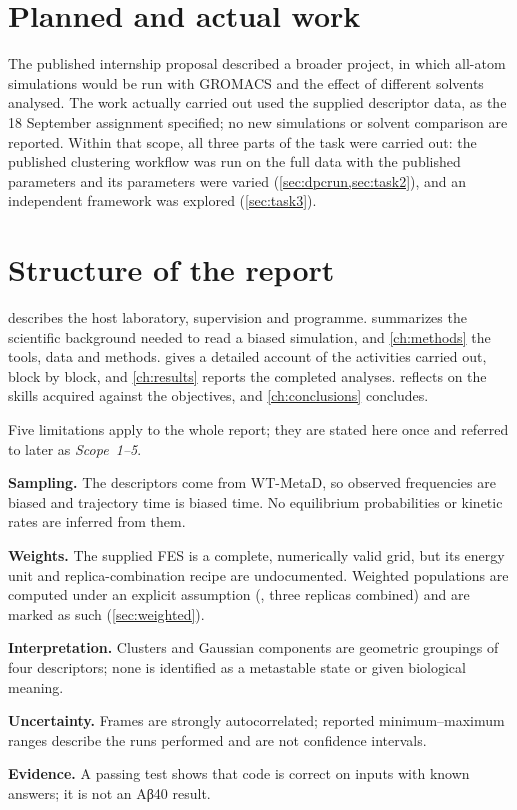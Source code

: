 \section{Planned and actual work}
The published internship proposal described a broader project, in which all-atom simulations would be run with GROMACS and the effect of different solvents analysed. The work actually carried out used the supplied descriptor data, as the 18 September assignment specified; no new simulations or solvent comparison are reported. Within that scope, all three parts of the task were carried out: the published clustering workflow was run on the full data with the published parameters and its parameters were varied (\cref{sec:dpcrun,sec:task2}), and an independent framework was explored (\cref{sec:task3}).

\section{Structure of the report}
 describes the host laboratory, supervision and programme.  summarizes the scientific background needed to read a biased simulation, and \cref{ch:methods} the tools, data and methods.  gives a detailed account of the activities carried out, block by block, and \cref{ch:results} reports the completed analyses.  reflects on the skills acquired against the objectives, and \cref{ch:conclusions} concludes.

Five limitations apply to the whole report; they are stated here once and referred to later as \emph{Scope~1--5}.

\begin{keyfindings}
\begin{protocolsteps}
\item \textbf{Sampling.} The descriptors come from WT-MetaD, so observed frequencies are biased and trajectory time is biased time. No equilibrium probabilities or kinetic rates are inferred from them.
\item \textbf{Weights.} The supplied FES is a complete, numerically valid grid, but its energy unit and replica-combination recipe are undocumented. Weighted populations are computed under an explicit assumption (\kJmol, three replicas combined) and are marked as such (\cref{sec:weighted}).
\item \textbf{Interpretation.} Clusters and Gaussian components are geometric groupings of four descriptors; none is identified as a metastable state or given biological meaning.
\item \textbf{Uncertainty.} Frames are strongly autocorrelated; reported minimum--maximum ranges describe the runs performed and are not confidence intervals.
\item \textbf{Evidence.} A passing test shows that code is correct on inputs with known answers; it is not an Aβ40 result.
\end{protocolsteps}
\end{keyfindings}
